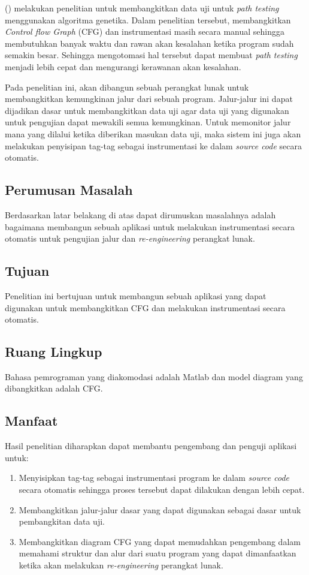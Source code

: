 \citeauthor{HERMADI2015} (\cite*{HERMADI2015}) melakukan penelitian untuk membangkitkan data uji untuk \textit{path testing} menggunakan algoritma genetika. Dalam penelitian tersebut, \citeauthor{HERMADI2015} membangkitkan \textit{Control flow Graph} (CFG) dan instrumentasi masih secara manual sehingga membutuhkan banyak waktu dan rawan akan kesalahan ketika program sudah semakin besar. Sehingga mengotomasi hal tersebut dapat membuat \textit{path testing} menjadi lebih cepat dan mengurangi kerawanan akan kesalahan.

Pada penelitian ini, akan dibangun sebuah perangkat lunak untuk membangkitkan kemungkinan jalur dari sebuah program. Jalur-jalur ini dapat dijadikan dasar untuk membangkitkan data uji agar data uji yang digunakan untuk pengujian dapat mewakili semua kemungkinan. Untuk memonitor jalur mana yang dilalui ketika diberikan masukan data uji, maka sistem ini juga akan melakukan penyisipan tag-tag sebagai instrumentasi ke dalam \textit{source code} secara otomatis. 

\subsection*{Perumusan Masalah}
Berdasarkan latar belakang di atas dapat dirumuskan masalahnya adalah bagaimana membangun sebuah aplikasi untuk melakukan instrumentasi secara otomatis untuk pengujian jalur dan \textit{re-engineering} perangkat lunak.

\subsection*{Tujuan}
Penelitian ini bertujuan untuk membangun sebuah aplikasi yang dapat digunakan untuk membangkitkan CFG dan melakukan instrumentasi secara otomatis.

\subsection*{Ruang Lingkup}
Bahasa pemrograman yang diakomodasi adalah Matlab dan model diagram yang dibangkitkan adalah CFG.

\subsection*{Manfaat}
Hasil penelitian diharapkan dapat membantu pengembang dan penguji aplikasi untuk:
\begin{enumerate}[noitemsep] 
\item Menyisipkan tag-tag sebagai instrumentasi program ke dalam \textit{source code} secara otomatis sehingga proses tersebut dapat dilakukan dengan lebih cepat.
\item Membangkitkan jalur-jalur dasar yang dapat digunakan sebagai dasar untuk pembangkitan data uji.
\item Membangkitkan diagram CFG yang dapat memudahkan pengembang dalam memahami struktur dan alur dari suatu program yang dapat dimanfaatkan ketika akan melakukan \textit{re-engineering} perangkat lunak.
\end{enumerate}

